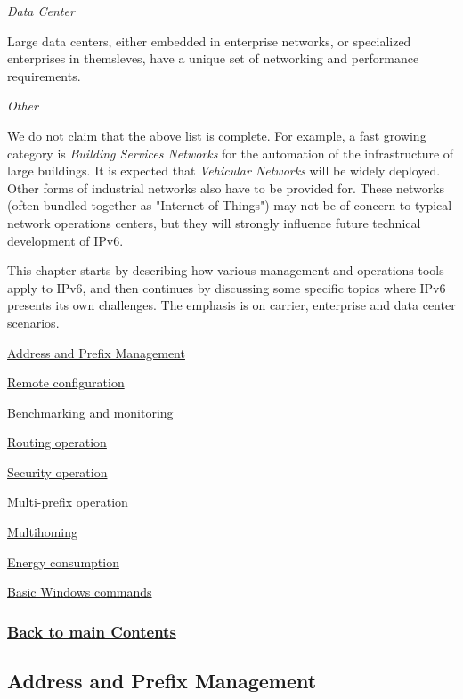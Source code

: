 \documentclass[
]{article}
\begin{document}
\emph{Data Center}

Large data centers, either embedded in enterprise networks, or
specialized enterprises in themsleves, have a unique set of networking
and performance requirements.

\emph{Other}

We do not claim that the above list is complete. For example, a fast
growing category is \emph{Building Services Networks} for the automation
of the infrastructure of large buildings. It is expected that
\emph{Vehicular Networks} will be widely deployed. Other forms of
industrial networks also have to be provided for. These networks (often
bundled together as "Internet of Things") may not be of concern to
typical network operations centers, but they will strongly influence
future technical development of IPv6.

This chapter starts by describing how various management and operations
tools apply to IPv6, and then continues by discussing some specific
topics where IPv6 presents its own challenges. The emphasis is on
carrier, enterprise and data center scenarios.

\hyperref[address-and-prefix-management]{Address and Prefix Management}

\hyperref[remote-configuration]{Remote configuration}

\hyperref[benchmarking-and-monitoring]{Benchmarking and monitoring}

\hyperref[routing-operation]{Routing operation}

\hyperref[security-operation]{Security operation}

\hyperref[multi-prefix-operation]{Multi-prefix operation}

\hyperref[multihoming]{Multihoming}

\hyperref[energy-consumption]{Energy consumption}

\hyperref[basic-windows-commands]{Basic Windows commands}

\subsubsection{\texorpdfstring{\hyperref[list-of-contents]{Back to main
Contents}}{Back to main Contents}}\label{back-to-main-contents-5}

\pagebreak

\subsection{Address and Prefix
Management}\label{address-and-prefix-management}
\end{document}
